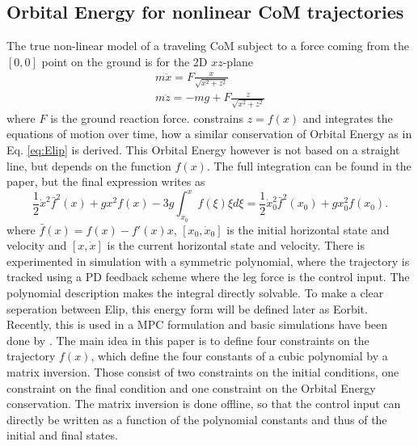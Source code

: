\subsection{Orbital Energy for nonlinear \ac{CoM} trajectories}
The true non-linear model of a traveling \ac{CoM} subject to a force coming from the $[0,0]$ point on the ground is for the \ac{2D} $xz$\nobreakdash-plane
\begin{eqnarray}
m\ddot{x} = F \frac{x}{\sqrt{x^2+z^2}}\\
m\ddot{z} = -mg+F \frac{z}{\sqrt{x^2+z^2}}
\label{eq:nonlindyn}
\end{eqnarray} 
where $F$ is the ground reaction force. \cite{pratt2007derivation} constrains $z=f(x)$ and integrates  the equations of motion over time, how a similar conservation of Orbital Energy as in Eq. \eqref{eq:Elip} is derived. This Orbital Energy however is not based on a straight line, but depends on the function $f(x)$. The  full integration can be found in the paper, but the final expression writes as
\begin{equation}
    \frac{1}{2}\dot{x}^2\bar{f}^2(x)+gx^2f(x) - 3g\int_{x_0}^xf(\xi)\xi d\xi = \frac{1}{2}\dot{x}_0^2\bar{f}^2(x_0)+gx_0^2f(x_0).
\end{equation}
where $\bar{f}(x)=f(x)-f'(x)x$, $[x_0,\dot{x}_0]$ is the initial horizontal state and velocity and $[x,\dot{x}]$ is the current horizontal state and velocity. There is experimented in simulation with a symmetric polynomial, where the trajectory is tracked using a PD feedback scheme where the leg force is the control input. The polynomial description makes the integral directly solvable. To make a clear seperation between \ac{Elip}, this energy form will be defined later as \ac{Eorbit}.\\
Recently, this is used in a \ac{MPC} formulation and basic simulations have been done by \cite{koolen2016balance}. The main idea in this paper is to define four constraints on the trajectory $f(x)$, which define the four constants of a cubic polynomial by a matrix inversion. Those consist of two constraints on the initial conditions, one constraint on the final condition and one constraint on the Orbital Energy conservation. The matrix inversion is done offline, so that the control input can directly be written as a function of the polynomial constants and thus of the initial and final states. 

